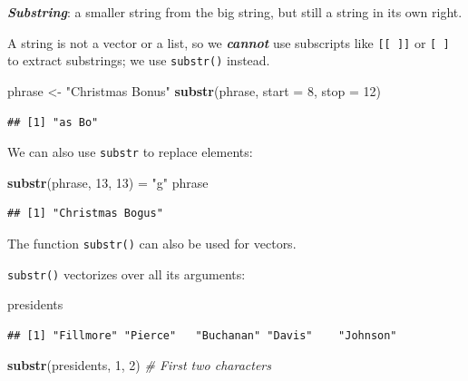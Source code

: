 \documentclass[
]{book}
\newenvironment{Shaded}{\begin{snugshade}}{\end{snugshade}}
\newcommand{\CommentTok}[1]{\textcolor[rgb]{0.56,0.35,0.01}{\textit{#1}}}
\newcommand{\DataTypeTok}[1]{\textcolor[rgb]{0.13,0.29,0.53}{#1}}
\newcommand{\DecValTok}[1]{\textcolor[rgb]{0.00,0.00,0.81}{#1}}
\newcommand{\KeywordTok}[1]{\textcolor[rgb]{0.13,0.29,0.53}{\textbf{#1}}}
\newcommand{\NormalTok}[1]{#1}
\newcommand{\StringTok}[1]{\textcolor[rgb]{0.31,0.60,0.02}{#1}}
\begin{document}
\textbf{\emph{Substring}}: a smaller string from the big string, but still a string in its own right.

A string is not a vector or a list, so we \textbf{\emph{cannot}} use subscripts like \texttt{{[}{[}\ {]}{]}} or \texttt{{[}\ {]}} to extract substrings; we use \texttt{substr()} instead.

\begin{Shaded}
\begin{Highlighting}[]
\NormalTok{phrase <-}\StringTok{ "Christmas Bonus"}
\KeywordTok{substr}\NormalTok{(phrase, }\DataTypeTok{start =} \DecValTok{8}\NormalTok{, }\DataTypeTok{stop =} \DecValTok{12}\NormalTok{)}
\end{Highlighting}
\end{Shaded}

\begin{verbatim}
## [1] "as Bo"
\end{verbatim}

We can also use \texttt{substr} to replace elements:

\begin{Shaded}
\begin{Highlighting}[]
\KeywordTok{substr}\NormalTok{(phrase, }\DecValTok{13}\NormalTok{, }\DecValTok{13}\NormalTok{) =}\StringTok{ "g"}
\NormalTok{phrase}
\end{Highlighting}
\end{Shaded}

\begin{verbatim}
## [1] "Christmas Bogus"
\end{verbatim}

The function \texttt{substr()} can also be used for vectors.

\texttt{substr()} vectorizes over all its arguments:

\begin{Shaded}
\begin{Highlighting}[]
\NormalTok{presidents}
\end{Highlighting}
\end{Shaded}

\begin{verbatim}
## [1] "Fillmore" "Pierce"   "Buchanan" "Davis"    "Johnson"
\end{verbatim}

\begin{Shaded}
\begin{Highlighting}[]
\KeywordTok{substr}\NormalTok{(presidents, }\DecValTok{1}\NormalTok{, }\DecValTok{2}\NormalTok{)  }\CommentTok{# First two characters}
\end{Highlighting}
\end{Shaded}
\end{document}
